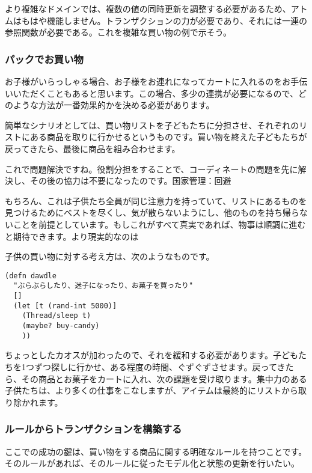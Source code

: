 より複雑なドメインでは、複数の値の同時更新を調整する必要があるため、アトムはもはや機能しません。トランザクションの力が必要であり、それには一連の参照関数が必要である。これを複雑な買い物の例で示そう。


\subsubsection{パックでお買い物}

お子様がいらっしゃる場合、お子様をお連れになってカートに入れるのをお手伝いいただくこともあると思います。この場合、多少の連携が必要になるので、どのような方法が一番効果的かを決める必要があります。

簡単なシナリオとしては、買い物リストを子どもたちに分担させ、それぞれのリストにある商品を取りに行かせるというものです。買い物を終えた子どもたちが戻ってきたら、最後に商品を組み合わせます。

これで問題解決ですね。役割分担をすることで、コーディネートの問題を先に解決し、その後の協力は不要になったのです。国家管理：回避

もちろん、これは子供たち全員が同じ注意力を持っていて、リストにあるものを見つけるためにベストを尽くし、気が散らないようにし、他のものを持ち帰らないことを前提としています。もしこれがすべて真実であれば、物事は順調に進むと期待できます。より現実的なのは

子供の買い物に対する考え方は、次のようなものです。



\begin{lstlisting}[numbers=none]
(defn dawdle
  "ぶらぶらしたり、迷子になったり、お菓子を買ったり"
  []
  (let [t (rand-int 5000)]
    (Thread/sleep t)
    (maybe? buy-candy)
    ))
\end{lstlisting}

ちょっとしたカオスが加わったので、それを緩和する必要があります。子どもたちを1つずつ探しに行かせ、ある程度の時間、ぐずぐずさせます。戻ってきたら、その商品とお菓子をカートに入れ、次の課題を受け取ります。集中力のある子供たちは、より多くの仕事をこなしますが、アイテムは最終的にリストから取り除かれます。

\subsubsection{ルールからトランザクションを構築する}

ここでの成功の鍵は、買い物をする商品に関する明確なルールを持つことです。そのルールがあれば、そのルールに従ったモデル化と状態の更新を行いたい。

